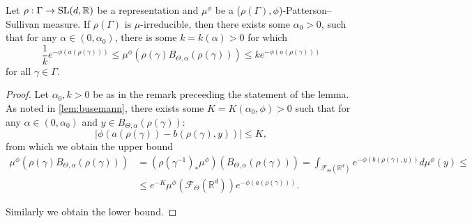 \documentclass{report}
\begin{document}
\begin{lemma}\label{lem:PSMeasureBounds}
    Let $\rho:\Gamma \to \operatorname{{\mathrm{SL}}}(d, \mathbb R)$ be a representation and $\mu^\phi$ be a ($\rho(\Gamma), \phi$)-Patterson--Sullivan measure.
    If $\rho(\Gamma)$ is $\mu$-irreducible, then there exists some $\alpha_0 > 0$, such that for any $\alpha \in (0, \alpha_0)$, there is some $k = k(\alpha) > 0$ for which
    \[
        \frac{1}{k} e^{-\phi(a(\rho(\gamma)))} 
        \leq 
        \mu^\phi(\rho(\gamma) B_{\Theta, \alpha}(\rho(\gamma))) 
        \leq
        k e^{-\phi(a(\rho(\gamma)))} 
    \]
    for all $\gamma \in \Gamma$. 
\end{lemma}
\begin{proof}
    Let $\alpha_0, k > 0$ be as in the remark preceeding the statement of the lemma.
    As noted in \cref{lem:busemann}, there exists some $K = K(\alpha_0, \phi) > 0$ such that for any $\alpha \in (0, \alpha_0)$ and $y \in B_{\Theta, \alpha}(\rho(\gamma))$:
    \[
        |\phi(a(\rho(\gamma)) - b(\rho(\gamma), y))| \leq K,
    \]
    from which we obtain the upper bound
    \begin{align*}
        \mu^\phi(\rho(\gamma) B_{\Theta, \alpha}(\rho(\gamma))) &=
        (\rho(\gamma^{-1})_*\mu^\phi)(B_{\Theta, \alpha}(\rho(\gamma))) =
        \int_{\mathcal F_\Theta(\mathbb R^d)} e^{-\phi(b(\rho(\gamma), y))} d\mu^\phi(y)\leq\\
        &\leq
        e^{-K} \mu^\phi(\mathcal F_\Theta (\mathbb R^d)) e^{-\phi(a(\rho(\gamma)))}.
    \end{align*}
    
    Similarly we obtain the lower bound.
\end{proof}
\end{document}
